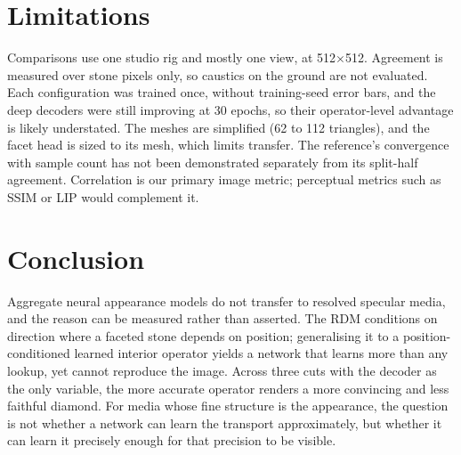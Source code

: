 \documentclass[conference]{IEEEtran}
\begin{document}
\section{Limitations}

Comparisons use one studio rig and mostly one view, at 512$\times$512.
Agreement is measured over stone pixels only, so caustics on the ground are not
evaluated. Each configuration was trained once, without training-seed error
bars, and the deep decoders were still improving at 30 epochs, so their
operator-level advantage is likely understated. The meshes are simplified (62 to
112 triangles), and the facet head is sized to its mesh, which limits transfer.
The reference's convergence with sample count has not been demonstrated
separately from its split-half agreement. Correlation is our primary image
metric; perceptual metrics such as SSIM or LIP would complement it.

\section{Conclusion}

Aggregate neural appearance models do not transfer to resolved specular media,
and the reason can be measured rather than asserted. The RDM conditions on
direction where a faceted stone depends on position; generalising it to a
position-conditioned learned interior operator yields a network that learns more than
any lookup, yet cannot reproduce the image. Across three cuts with the decoder as
the only variable, the more accurate operator renders a more convincing and less
faithful diamond. For media whose fine structure is the appearance, the question
is not whether a network can learn the transport approximately, but whether it
can learn it precisely enough for that precision to be visible.
\end{document}
